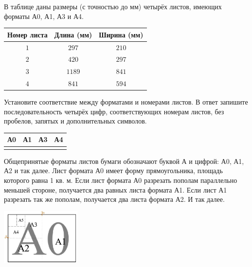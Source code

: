 %
%
%	
%
%
\begin{class}[number=4]
	\begin{listofex}
		\item В таблице даны размеры (с точностью до мм) четырёх листов, имеющих форматы А0, А1, А3 и А4.
		\begin{center}
			\footnotesize
			\begin{tabular}{|c|c|c|}
				\hline
				\rowcolor{gray}\textbf{Номер листа}&\textbf{Длина (мм)}&\textbf{Ширина (мм)}\\
				\hline
				\( 1 \)&\( 297 \)&\( 210 \)\\
				\hline
				\( 2 \)&\( 420 \)&\( 297 \)\\
				\hline
				\( 3 \)&\( 1189 \)&\( 841 \)\\
				\hline
				\( 4 \)&\( 841 \)&\( 594 \)\\
				\hline
			\end{tabular}
		\end{center}
		Установите соответствие между форматами и номерами листов. В ответ запишите последовательность четырёх цифр, соответствующих номерам листов, без пробелов, запятых и дополнительных символов.
		\begin{center}
			\footnotesize
			\begin{tabular}{|c|c|c|c|}
				\hline
				\rowcolor{gray}А0&А1&А3&А4\\
				\hline
				&&&\\
				\hline
			\end{tabular}
		\end{center}
		Общепринятые форматы листов бумаги обозначают буквой А и цифрой: А0, А1, А2 и так далее. Лист формата А0 имеет форму прямоугольника, площадь которого равна 1 кв. м. Если лист формата А0 разрезать пополам параллельно меньшей стороне, получается два равных листа формата А1. Если лист А1 разрезать так же пополам, получается два листа формата А2. И так далее.
		\begin{center}
			\includegraphics[align=t, width=0.3\textwidth]{pics/G91M3C4-1}

\end{center}
\end{listofex}
\end{class}
